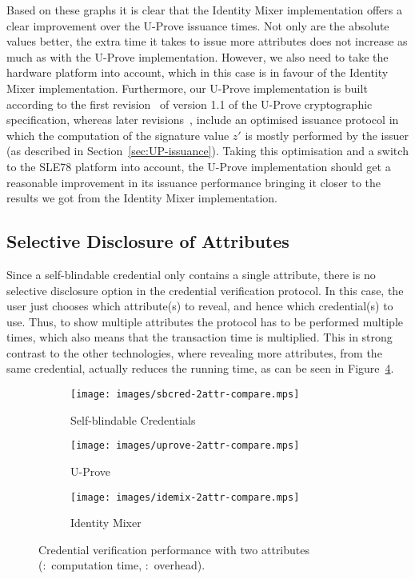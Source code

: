 Based on these graphs it is clear that the Identity Mixer implementation offers
a clear improvement over the U-Prove issuance times. Not only are the absolute
values better, the extra time it takes to issue more attributes does not
increase as much as with the U-Prove implementation. However, we also need to
take the hardware platform into account, which in this case is in favour of the
Identity Mixer implementation. Furthermore, our U-Prove implementation is built
according to the first revision~\cite{U-Prove_Crypto2011} of version 1.1 of the
U-Prove cryptographic specification, whereas later revisions~\cite{U-Prove_Crypto2013},
include an optimised issuance protocol in which the computation of the signature
value $z'$ is mostly performed by the issuer (as described in Section~\ref{sec:UP-issuance}). Taking
this optimisation and a switch to the SLE78 platform into account, the U-Prove
implementation should get a reasonable improvement in its issuance performance
bringing it closer to the results we got from the Identity Mixer implementation.

\subsection{Selective Disclosure of Attributes}

Since a self-blindable credential only contains a single attribute, there is no
selective disclosure option in the credential verification protocol. In this
case, the user just chooses which attribute(s) to reveal, and hence which
credential(s) to use. Thus, to show multiple attributes the protocol has to be
performed multiple times, which also means that the transaction time is
multiplied. This in strong contrast to the other technologies, where revealing
more attributes, from the same credential, actually reduces the running time, as
can be seen in Figure~\ref{fig:2attr-comparison}.

\begin{figure}
  \centering
  \begin{subfigure}[b]{0.33\textwidth}
    \texttt{[image: images/sbcred-2attr-compare.mps]}
    \caption{Self-blindable Credentials}
    \label{fig:sbcred-2attr}
  \end{subfigure}
  \begin{subfigure}[b]{0.32\textwidth}
    \texttt{[image: images/uprove-2attr-compare.mps]}
    \caption{U-Prove}
    \label{fig:uprove-2attr}
  \end{subfigure}
  \begin{subfigure}[b]{0.32\textwidth}
    \texttt{[image: images/idemix-2attr-compare.mps]}
    \caption{Identity Mixer}
    \label{fig:idemix-2attr}
  \end{subfigure}

  \caption[Credential verification performance with two attributes.]{
    Credential verification performance with two attributes
    (:~computation time,
      :~overhead).}
  \label{fig:2attr-comparison}
\end{figure}


